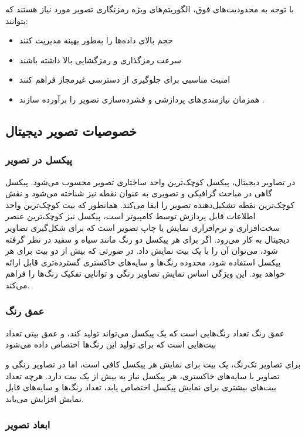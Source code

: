 با توجه به محدودیت‌های فوق، الگوریتم‌های ویژه رمزنگاری تصویر مورد نیاز هستند که بتوانند:

\begin{itemize}
    \item حجم بالای داده‌ها را به‌طور بهینه مدیریت کنند
    \item سرعت رمزگذاری و رمزگشایی بالا داشته باشند
    \item امنیت مناسبی برای جلوگیری از دسترسی غیرمجاز فراهم کنند
    \item همزمان نیازمندی‌های پردازشی و فشرده‌سازی تصویر را برآورده سازند \cite{ref41}.
\end{itemize}

\subsection{خصوصیات تصویر دیجیتال}

\subsubsection{پیکسل در تصویر}

در تصاویر دیجیتال، پیکسل کوچک‌ترین واحد ساختاری تصویر محسوب می‌شود. پیکسل گاهی در مباحث گرافیکی و تصویری به عنوان نقطه نیز شناخته می‌شود و نقش کوچک‌ترین نقطه تشکیل‌دهنده تصویر را ایفا می‌کند. همانطور که بیت کوچک‌ترین واحد اطلاعات قابل پردازش توسط کامپیوتر است، پیکسل نیز کوچک‌ترین عنصر سخت‌افزاری و نرم‌افزاری نمایش یا چاپ تصویر است که برای شکل‌گیری تصاویر دیجیتال به کار می‌رود. اگر برای هر پیکسل دو رنگ مانند سیاه و سفید در نظر گرفته شود، می‌توان آن را با یک بیت نمایش داد. در صورتی که بیش از دو بیت برای هر پیکسل استفاده شود، محدوده رنگ‌ها و سایه‌های خاکستری گسترده‌تری قابل ارائه خواهد بود. این ویژگی اساس نمایش تصاویر رنگی و توانایی تفکیک رنگ‌ها را فراهم می‌کند\cite{ref42}.

\subsubsection{عمق رنگ}

عمق رنگ تعداد رنگ‌هایی است که یک پیکسل می‌تواند تولید کند، و عمق بیتی تعداد بیت‌هایی است که برای تولید این رنگ‌ها اختصاص داده می‌شود

برای تصاویر تک‌رنگ، یک بیت برای نمایش هر پیکسل کافی است، اما در تصاویر رنگی و تصاویر با سایه‌های خاکستری، هر پیکسل نیاز به بیش از یک بیت دارد. هرچه تعداد بیت‌های بیشتری برای نمایش پیکسل اختصاص یابد، تعداد رنگ‌ها و سایه‌های قابل نمایش افزایش می‌یابد\cite{ref42}.

\subsubsection{ابعاد تصویر}

